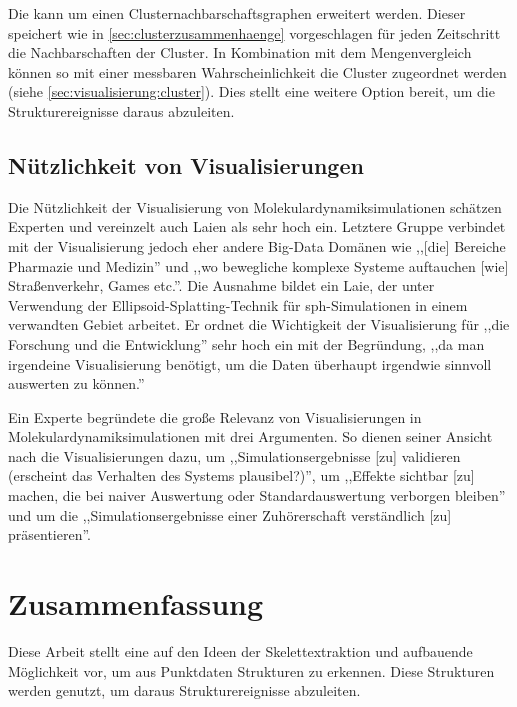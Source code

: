 Die \SECC kann um einen Clusternachbarschaftsgraphen erweitert werden. Dieser speichert wie in \autoref{sec:clusterzusammenhaenge} vorgeschlagen für jeden Zeitschritt die Nachbarschaften der Cluster. In Kombination mit dem Mengenvergleich können so mit einer messbaren Wahrscheinlichkeit die Cluster zugeordnet werden (siehe \autoref{sec:visualisierung:cluster}). %
Dies stellt eine weitere Option bereit, um die Strukturereignisse daraus abzuleiten.

\section{Nützlichkeit von Visualisierungen}
Die Nützlichkeit der Visualisierung von Molekulardynamiksimulationen schätzen Experten und vereinzelt auch Laien als sehr hoch ein. Letztere Gruppe verbindet mit der Visualisierung jedoch eher andere Big-Data Domänen wie ,,[die] Bereiche Pharmazie und Medizin'' und ,,wo bewegliche komplexe Systeme auftauchen [wie] Straßenverkehr, Games etc.''. Die Ausnahme bildet ein Laie, der unter Verwendung der Ellipsoid-Splatting-Technik für \gls{sph}-Simulationen in einem verwandten Gebiet arbeitet. Er ordnet die Wichtigkeit der Visualisierung für ,,die Forschung und die Entwicklung'' sehr hoch ein mit der Begründung, ,,da man irgendeine Visualisierung benötigt, um die Daten überhaupt irgendwie sinnvoll auswerten zu können.''

Ein Experte begründete die große Relevanz von Visualisierungen in Molekulardynamiksimulationen mit drei Argumenten. So dienen seiner Ansicht nach die Visualisierungen dazu, um ,,Simulationsergebnisse [zu] validieren (erscheint das Verhalten des Systems plausibel?)'', um ,,Effekte sichtbar  [zu] machen, die bei naiver Auswertung oder Standardauswertung verborgen bleiben'' und um die ,,Simulationsergebnisse einer Zuhörerschaft verständlich [zu] präsentieren''.


\chapter{Zusammenfassung}

Diese Arbeit stellt eine auf den Ideen der Skelettextraktion und  aufbauende Möglichkeit vor, um aus Punktdaten Strukturen zu erkennen. Diese Strukturen werden genutzt, um daraus Strukturereignisse abzuleiten.

